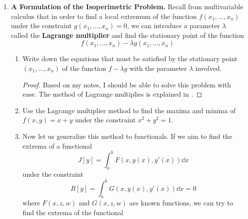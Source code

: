 \documentclass[../psets.tex]{subfiles}
\begin{document}
\begin{enumerate}
\begin{enumerate}
        \begin{proof}
            Imagine pulling two rings spanned by a soap film farther and farther apart. The soap film won't be stable forever; indeed, at some point, it will collapse in the middle and the two halves will retreat onto their distinct rings. Indeed, at some point, the area $2\pi a^2$ will be smaller than the ever-increasing (and non-asymptotic) surface area of the catenoid. Thus, the catenoid is a local minimum of the variational problem, not necessarily a global minimum.
        \end{proof}
    \end{enumerate}
    \item \textbf{A Formulation of the Isoperimetric Problem.} Recall from multivariable calculus that in order to find a local extremum of the function $f(x_1,\dots,x_n)$ under the constraint $g(x_1,\dots,x_n)=0$, we can introduce a parameter $\lambda$ called the \textbf{Lagrange multiplier} and find the stationary point of the function
    \begin{equation*}
        f(x_1,\dots,x_n)-\lambda g(x_1,\dots,x_n)
    \end{equation*}
    \begin{enumerate}
        \item Write down the equations that must be satisfied by the stationary point $(x_1,\dots,x_n)$ of the function $f-\lambda g$ with the parameter $\lambda$ involved.
        \begin{proof}
            Based on my notes, I should be able to solve this problem with ease. The method of Lagrange multiplies is explained in \textcite{bib:CAAGThomasNotes}.
        \end{proof}
        \item Use the Lagrange multiplier method to find the maxima and minima of $f(x,y)=x+y$ under the constraint $x^2+y^2=1$.
        \item Now let us generalize this method to functionals. If we aim to find the extrema of a functional
        \begin{equation*}
            J[y] = \int_a^bF(x,y(x),y'(x))\dd{x}
        \end{equation*}
        under the constraint
        \begin{equation*}
            R[y] = \int_a^bG(x,y(x),y'(x))\dd{x} = 0
        \end{equation*}
        where $F(x,z,w)$ and $G(x,z,w)$ are known functions, we can try to find the extrema of the functional
        \begin{equation*}

\end{equation*}
\end{enumerate}
\end{enumerate}
\end{document}
